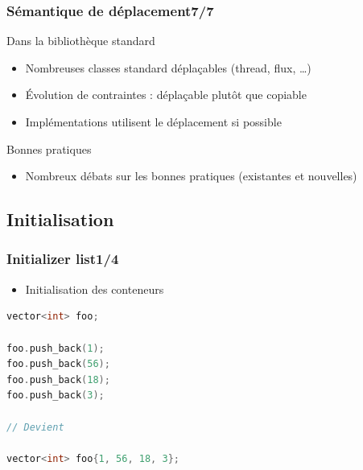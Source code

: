 \documentclass[C++.tex]{subfiles}
\begin{document}
\begin{frame}
	\frametitle{Sémantique de déplacement\titlehfill{}7/7}
	\begin{block}{Dans la bibliothèque standard}
		\begin{itemize}
			\item Nombreuses classes standard déplaçables (thread, flux, \ldots)


			\item Évolution de contraintes : déplaçable plutôt que copiable

			
			\item Implémentations utilisent le déplacement si possible
		\end{itemize}
	\end{block}

	\begin{block}{Bonnes pratiques}
		\begin{itemize}
			\item Nombreux débats sur les bonnes pratiques (existantes et nouvelles)
		\end{itemize}

	\end{block}
\end{frame}

\subsection*{Initialisation}
\begin{frame}[fragile]
	\frametitle{Initializer list\titlehfill{}1/4}
	\begin{itemize}
		\item Initialisation des conteneurs
	\end{itemize}

	\begin{lstlisting}[language=C++]
vector<int> foo;

foo.push_back(1);
foo.push_back(56);
foo.push_back(18);
foo.push_back(3);

// Devient

vector<int> foo{1, 56, 18, 3};\end{lstlisting}
\end{frame}
\end{document}
